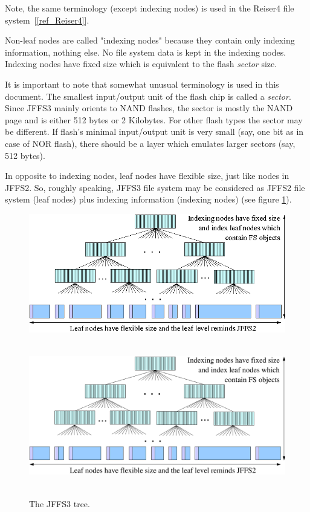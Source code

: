 \documentclass[12pt,a4paper,oneside,titlepage]{article}
\begin{document}
Note, the same terminology (except indexing nodes) is used in the Reiser4 file
system~[\ref{ref_Reiser4}].

\mbox{Non-leaf} nodes are called "indexing nodes" because they contain only
indexing information, nothing else. No file system data is kept in the indexing
nodes. Indexing nodes have fixed size which is equivalent to the flash
\emph{sector} size.

It is important to note that somewhat unusual terminology is used in this
document. The smallest input/output unit of the flash chip is called a
\emph{sector}. Since JFFS3 mainly orients to NAND flashes, the sector is mostly
the NAND page and is either 512 bytes or 2 Kilobytes. For other flash types the
sector may be different. If flash's minimal input/output unit is very small
(say, one bit as in case of NOR flash), there should be a layer which emulates
larger sectors (say, 512 bytes).

In opposite to indexing nodes, leaf nodes have flexible size, just like nodes
in JFFS2. So, roughly speaking, JFFS3 file system may be considered as JFFS2
file system (leaf nodes) plus indexing information (indexing nodes) (see figure
\ref{ref_FigureBTree_02}). 

%
%
\begin{figure}[h]
\begin{center}
\begin{htmlonly}
\includegraphics{pics/btree-02.png}
\end{htmlonly}
\includegraphics[width=159mm,height=70mm]{pics/btree-02.pdf}
\end{center}
\caption{The JFFS3 tree.}
\label{ref_FigureBTree_02}
\end{figure}
\end{document}
